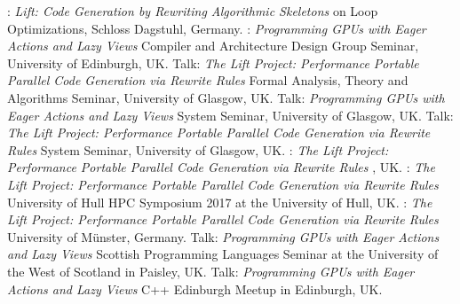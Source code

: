          {:
          \emph{Lift: Code Generation by Rewriting Algorithmic Skeletons}\newline
         \small {} on Loop Optimizations, Schloss Dagstuhl, Germany.}
         {:
          \emph{Programming GPUs with Eager Actions and Lazy Views}\newline
         \small Compiler and Architecture Design Group Seminar, University of Edinburgh, UK.}
         {Talk: \emph{The Lift Project: Performance Portable Parallel Code Generation via Rewrite Rules}\newline
         \small Formal Analysis, Theory and Algorithms Seminar, University of Glasgow, UK.}
         {Talk: \emph{Programming GPUs with Eager Actions and Lazy Views}\newline
         \small System Seminar, University of Glasgow, UK.}
         {Talk: \emph{The Lift Project: Performance Portable Parallel Code Generation via Rewrite Rules}\newline
         \small System Seminar, University of Glasgow, UK.}
         {:
          \emph{The Lift Project: Performance Portable Parallel Code Generation via Rewrite Rules}\newline
         \small {}, UK.}
         {:\newline
          \emph{The Lift Project: Performance Portable Parallel Code Generation via Rewrite Rules}\newline
         \small University of Hull HPC Symposium 2017 at the University of Hull, UK.}
         {:\newline
          \emph{The Lift Project: Performance Portable Parallel Code Generation via Rewrite Rules}\newline
         \small University of Münster, Germany.}
         {Talk: \emph{Programming GPUs with Eager Actions and Lazy Views}\newline
         \small Scottish Programming Languages Seminar at the University of the West of Scotland in Paisley, UK.}
         {Talk: \emph{Programming GPUs with Eager Actions and Lazy Views}\newline
         \small C++ Edinburgh Meetup in Edinburgh, UK.}

